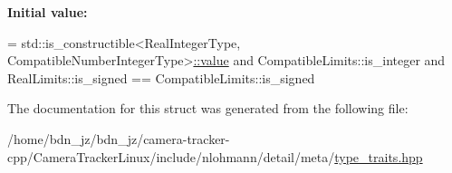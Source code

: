 {\bfseries Initial value\+:}
\begin{DoxyCode}
=
        std::is\_constructible<RealIntegerType,
        CompatibleNumberIntegerType>\hyperlink{structnlohmann_1_1detail_1_1is__compatible__integer__type__impl_3_01_real_integer_type_00_01_com5aa74bcf254245a639da00509f4d2655_a478242daac7a70e28c749bfec00d1c1b}{::value} and
        CompatibleLimits::is\_integer and
        RealLimits::is\_signed == CompatibleLimits::is\_signed
\end{DoxyCode}


The documentation for this struct was generated from the following file\+:\begin{DoxyCompactItemize}
\item 
/home/bdn\+\_\+jz/bdn\+\_\+jz/camera-\/tracker-\/cpp/\+Camera\+Tracker\+Linux/include/nlohmann/detail/meta/\hyperlink{type__traits_8hpp}{type\+\_\+traits.\+hpp}\end{DoxyCompactItemize}
